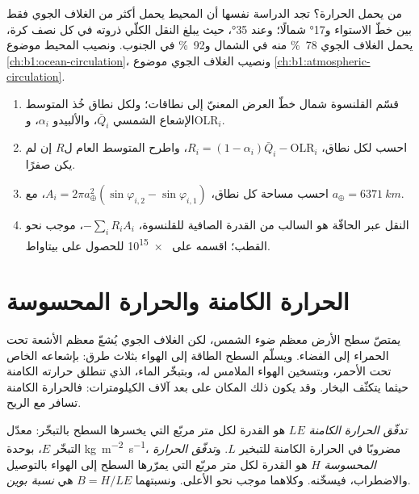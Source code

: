 من يحمل الحرارة؟ تجد الدراسة نفسها أن المحيط يحمل أكثر من الغلاف الجوي فقط بين خطّ الاستواء و\ang{17} شمالًا؛ وعند \ang{35}، حيث يبلغ النقل الكلّي ذروته في كل نصف كرة، يحمل الغلاف الجوي \qty{78}{\percent} منه في الشمال و\qty{92}{\percent} في الجنوب. ونصيب المحيط موضوع \cref{ch:b1:ocean-circulation}، ونصيب الغلاف الجوي موضوع \cref{ch:b1:atmospheric-circulation}.

\begin{method}\label{met:b1:radiation-heat-transport:bands}
\begin{enumerate}
  \item قسّم القلنسوة شمال خطّ العرض المعنيّ إلى نطاقات؛ ولكل نطاق خُذ المتوسط الإشعاع الشمسي $\bar Q_i$، والألبيدو $\alpha_i$، وOLR$_i$.
  \item احسب  لكل نطاق، $R_i = (1 - \alpha_i)\bar Q_i -
        \text{OLR}_i$، واطرح المتوسط العام ل$R$ إن لم يكن صفرًا.
  \item احسب مساحة كل نطاق، $A_i = 2\pi a_\oplus^2(\sin\varphi_{i,2} -
        \sin\varphi_{i,1})$، مع $a_\oplus = \qty{6371}{km}$.
  \item النقل عبر الحافّة هو السالب من القدرة الصافية للقلنسوة، $-\sum_i R_i A_i$، موجب نحو القطب؛ اقسمه على \num{e15} للحصول على بيتاواط.
\end{enumerate}
\end{method}

\section{الحرارة الكامنة والحرارة المحسوسة}\label{sec:b1:radiation-heat-transport:latent}

يمتصّ سطح الأرض معظم ضوء الشمس، لكن الغلاف الجوي يُشعّ معظم الأشعة تحت الحمراء إلى الفضاء. ويسلّم السطح الطاقة إلى الهواء بثلاث طرق: بإشعاعه الخاص تحت الأحمر، وبتسخين الهواء الملامس له، وبتبخّر الماء، الذي تنطلق حرارته الكامنة حيثما يتكثّف البخار. وقد يكون ذلك المكان على بعد آلاف الكيلومترات: فالحرارة الكامنة تسافر مع الريح.

\begin{definition}\label{def:b1:radiation-heat-transport:surface-fluxes}
\emph{تدفّق الحرارة الكامنة} $LE$ هو القدرة لكل متر مربّع التي يخسرها السطح بالتبخّر: معدّل التبخّر $E$، بوحدة \unit{kg.m^{-2}.s^{-1}}، مضروبًا في الحرارة الكامنة للتبخير $L$. و\emph{تدفّق الحرارة المحسوسة} $H$ هو القدرة لكل متر مربّع التي يمرّرها السطح إلى الهواء بالتوصيل والاضطراب، فيسخّنه. وكلاهما موجب نحو الأعلى. ونسبتهما $B = H/LE$ هي \emph{نسبة بوين}.
\end{definition}

